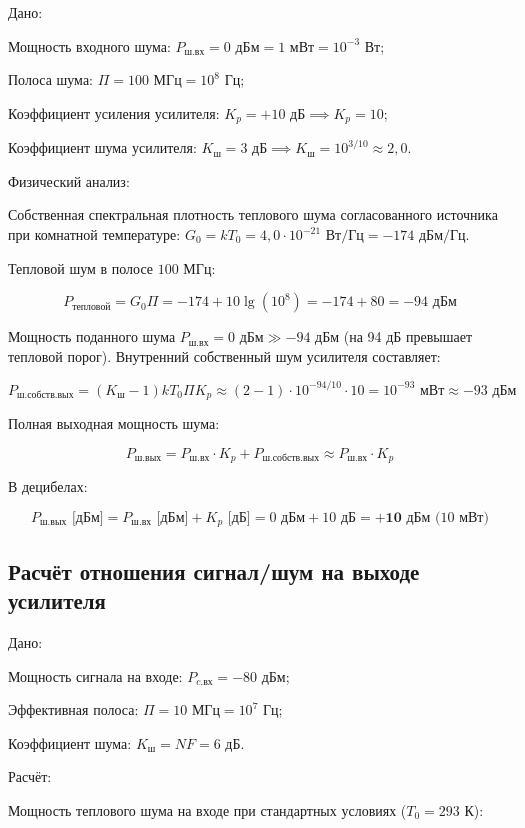 Дано:

Мощность входного шума: $P_{\text{ш.вх}} = 0\text{ дБм} = 1\text{ мВт} = 10^{-3}\text{ Вт}$;

Полоса шума: $\Pi = 100\text{ МГц} = 10^8\text{ Гц}$;

Коэффициент усиления усилителя: $K_p = +10\text{ дБ} \implies K_p = 10$;

Коэффициент шума усилителя: $K_{\text{ш}} = 3\text{ дБ} \implies K_{\text{ш}} = 10^{3/10} \approx 2{,}0$.

Физический анализ:

Собственная спектральная плотность теплового шума согласованного источника при комнатной температуре: $G_0 = k T_0 = 4{,}0 \cdot 10^{-21}\text{ Вт/Гц} = -174\text{ дБм/Гц}$.

Тепловой шум в полосе $100\text{ МГц}$:


$$P_{\text{тепловой}} = G_0 \Pi = -174 + 10\lg(10^8) = -174 + 80 = -94\text{ дБм}$$

Мощность поданного шума $P_{\text{ш.вх}} = 0\text{ дБм} \gg -94\text{ дБм}$ (на 94 дБ превышает тепловой порог). Внутренний собственный шум усилителя составляет:


$$P_{\text{ш.собств.вых}} = (K_{\text{ш}} - 1) k T_0 \Pi K_p \approx (2 - 1) \cdot 10^{-94/10} \cdot 10 = 10^{-93}\text{ мВт} \approx -93\text{ дБм}$$

Полная выходная мощность шума:


$$P_{\text{ш.вых}} = P_{\text{ш.вх}} \cdot K_p + P_{\text{ш.собств.вых}} \approx P_{\text{ш.вх}} \cdot K_p$$


В децибелах:


$$P_{\text{ш.вых}}\text{ [дБм]} = P_{\text{ш.вх}}\text{ [дБм]} + K_p\text{ [дБ]} = 0\text{ дБм} + 10\text{ дБ} = \mathbf{+10\text{ дБм}}\text{ (10 мВт)}$$

\subsection* {Расчёт отношения сигнал/шум на выходе усилителя}

Дано:

Мощность сигнала на входе: $P_{c.\text{вх}} = -80\text{ дБм}$;

Эффективная полоса: $\Pi = 10\text{ МГц} = 10^7\text{ Гц}$;

Коэффициент шума: $K_{\text{ш}} = NF = 6\text{ дБ}$.

Расчёт:

Мощность теплового шума на входе при стандартных условиях ($T_0 = 293\text{ К}$):


